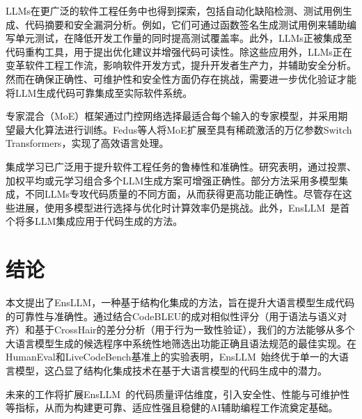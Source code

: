 \documentclass{article}
\newcommand{\tool}{EnsLLM}
\begin{document}
LLMs在更广泛的软件工程任务中也得到探索，包括自动化缺陷检测、测试用例生成、代码摘要和安全漏洞分析\cite{rahul2023llm, mueller2023automated}。例如，它们可通过函数签名生成测试用例来辅助编写单元测试，在降低开发工作量的同时提高测试覆盖率\cite{mueller2023automated}。此外，LLMs正被集成至代码重构工具，用于提出优化建议并增强代码可读性\cite{zhao2022large}。除这些应用外，LLMs正在变革软件工程工作流，影响软件开发方式\cite{imai2022github, liu2023fill}，提升开发者生产力\cite{dakhel2023github, ziegler2022productivity}，并辅助安全分析\cite{pearce2023examining}。然而在确保正确性、可维护性和安全性方面仍存在挑战，需要进一步优化验证才能将LLM生成代码可靠集成至实际软件系统。

专家混合（MoE）框架\cite{jordan1994hierarchical}通过门控网络选择最适合每个输入的专家模型，并采用期望最大化算法进行训练。Fedus等人\cite{fedus2021switch}将MoE扩展至具有稀疏激活的万亿参数Switch Transformers，实现了高效语言处理。

集成学习已广泛用于提升软件工程任务的鲁棒性和准确性。研究表明，通过投票、加权平均或元学习组合多个LLM生成方案可增强正确性\cite{zhang2023ensemble, wang2023code}。部分方法采用多模型集成，不同LLMs专攻代码质量的不同方面，从而获得更高功能正确性\cite{wang2023code}。尽管存在这些进展，使用多模型进行选择与优化时计算效率仍是挑战。此外，\tool\ 是首个将多LLM集成应用于代码生成的方法。
\section{结论}

本文提出了\tool，一种基于结构化集成的方法，旨在提升大语言模型生成代码的可靠性与准确性。通过结合CodeBLEU的成对相似性评分（用于语法与语义对齐）和基于CrossHair的差分分析（用于行为一致性验证），我们的方法能够从多个大语言模型生成的候选程序中系统性地筛选出功能正确且语法规范的最佳实现。在HumanEval和LiveCodeBench基准上的实验表明，\tool\ 始终优于单一的大语言模型，这凸显了结构化集成技术在基于大语言模型的代码生成中的潜力。

未来的工作将扩展\tool\ 的代码质量评估维度，引入安全性、性能与可维护性等指标，从而为构建更可靠、适应性强且稳健的AI辅助编程工作流奠定基础。



\end{document}
